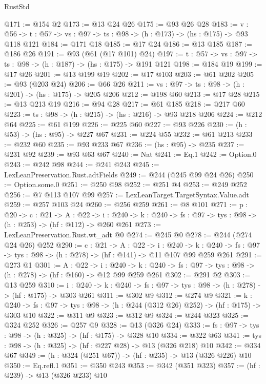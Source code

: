 \begin{lexlean}{RustStd}
\begin{coremodule}
@171 := @154 @2
@173 := @13 @24 @26
@175 := @93 @26 @28
@183 := {v : @56} ->
  {t : @57} -> {vs : @97} -> {ts : @98} -> (h : @173) -> (hs : @175) -> @93 @118 @121
@184 := @171 @18
@185 := @17 @24
@186 := @13 @185
@187 := @186 @26
@191 := @93 (@61 (@17 @101) @24)
@197 := {t : @57} -> {vs : @97} -> {ts : @98} -> (h : @187) -> (hs : @175) -> @191 @121
@198 := @184 @19
@199 := @17 @26
@201 := @13 @199 @19
@202 := @17 @103
@203 := @61 @202
@205 := @93 (@203 @24)
@206 := @66 @26
@211 := {vs : @97} -> {ts : @98} -> (h : @201) -> (hs : @175) -> @205 @206
@212 := @198 @60
@213 := @17 @28
@215 := @13 @213 @19
@216 := @94 @28
@217 := @61 @185
@218 := @217 @60
@223 := {ts : @98} -> (h : @215) -> (hs : @216) -> @93 @218 @206
@224 := @212 @64
@225 := @61 @199
@226 := @225 @60
@227 := @93 @226
@230 := (h : @53) -> (hs : @95) -> @227 @67
@231 := @224 @55
@232 := @61 @213
@233 := @232 @60
@235 := @93 @233 @67
@236 := (hs : @95) -> @235
@237 := @231 @92
@239 := @93 @63 @67
@240 := Nat
@241 := Eq.{1}
@242 := Option.{0}
@243 := @242 @98
@244 := @241 @243
@245 := LexLeanPreservation.Rust.adtFields
@249 := @244 (@245 @99 @24 @26)
@250 := Option.some.{0}
@251 := @250 @98
@252 := @251 @4
@253 := @249 @252
@256 := @7 @113 @107 @99
@257 := LexLeanTarget.TargetSyntax.Value.adt
@259 := @257 @103 @24
@260 := @256 @259
@261 := @8 @101
@271 := {p : @20} ->
  {c : @21} ->
  {A : @22} ->
  {i : @240} -> {k : @240} -> {fs : @97} -> {tys : @98} -> (h : @253) -> (hf : @112) -> @260 @261
@273 := LexLeanPreservation.Rust.wt_adt @0
@274 := @245 @0
@278 := @244 (@274 @24 @26) @252
@290 := {c : @21} ->
  {A : @22} ->
  {i : @240} ->
  {k : @240} -> {fs : @97} -> {tys : @98} -> (h : @278) -> (hf : @141) -> @11 @107 @99 @259 @261
@291 := @273 @1
@301 := {A : @22} ->
  {i : @240} ->
  {k : @240} -> {fs : @97} -> {tys : @98} -> (h : @278) -> (hf : @160) -> @12 @99 @259 @261
@302 := @291 @2
@303 := @13 @259
@310 := {i : @240} ->
  {k : @240} -> {fs : @97} -> {tys : @98} -> (h : @278) -> (hf : @175) -> @303 @261
@311 := @302 @9
@312 := @274 @9
@321 := {k : @240} ->
  {fs : @97} -> {tys : @98} -> (h : @244 (@312 @26) @252) -> (hf : @175) -> @303 @10
@322 := @311 @9
@323 := @312 @9
@324 := @244 @323
@325 := @324 @252
@326 := @257 @9
@328 := @13 (@326 @24)
@333 := {fs : @97} -> {tys : @98} -> (h : @325) -> (hf : @175) -> @328 @10
@334 := @322 @63
@341 := {tys : @98} -> (h : @325) -> (hf : @227 @28) -> @13 (@326 @218) @10
@342 := @334 @67
@349 := (h : @324 (@251 @67)) -> (hf : @235) -> @13 (@326 @226) @10
@350 := Eq.refl.{1}
@351 := @350 @243
@353 := @342 (@351 @323)
@357 := (hf : @239) -> @13 (@326 @233) @10

\end{coremodule}
\end{lexlean}

